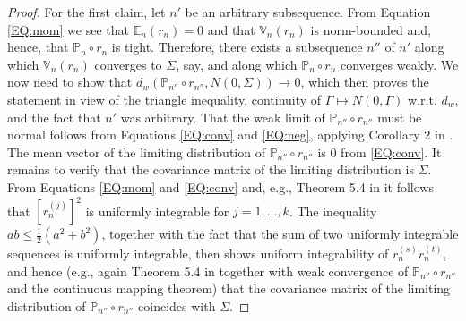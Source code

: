 \documentclass[preprint]{imsart}
\numberwithin{equation}{section}
\begin{document}
\begin{proof}
For the first claim, let $n'$ be an arbitrary subsequence. From Equation \eqref{EQ:mom} we see that $\mathbb{E}_n(r_n) = 0$ and that $\mathbb{V}_n(r_n)$ is norm-bounded and, hence, that $\mathbb{P}_n \circ r_n$ is tight. Therefore, there exists a subsequence $n''$ of $n'$ along which $\mathbb{V}_n(r_n)$ converges to $\Sigma$, say, and along which $\mathbb{P}_n \circ r_n$ converges weakly. We now need to show that $d_w(\mathbb{P}_{n''} \circ r_{n''}, N(0, \Sigma)) \rightarrow 0$, which then proves the statement in view of the triangle inequality, continuity of $\Gamma \mapsto N(0, \Gamma)$ w.r.t. $d_w$, and the fact that $n'$ was arbitrary. That the weak limit of $\mathbb{P}_{n''} \circ r_{n''}$ must be normal follows from Equations \eqref{EQ:conv} and \eqref{EQ:neg}, applying Corollary 2 in \cite{pollak1972}. The mean vector of the limiting distribution of $\mathbb{P}_{n''} \circ r_{n''}$ is $0$ from \eqref{EQ:conv}. It remains to verify that the covariance matrix of the limiting distribution is $\Sigma$. From Equations \eqref{EQ:mom} and \eqref{EQ:conv} and, e.g., Theorem 5.4 in \cite{bill2} it follows that $[r_{n}^{(j)}]^2$ is uniformly integrable for $j = 1, \hdots, k$. The inequality $ab \leq \frac{1}{2}(a^2 + b^2)$, together with the fact that the sum of two uniformly integrable sequences is uniformly integrable, then shows uniform integrability of $r_n^{(s)}r_n^{(t)}$, and hence (e.g., again Theorem 5.4 in \cite{bill2} together with weak convergence of $\mathbb{P}_{n''} \circ r_{n''}$ and the continuous mapping theorem) that the covariance matrix of the limiting distribution of $\mathbb{P}_{n''} \circ r_{n''}$ coincides with $\Sigma$.


\end{proof}
\end{document}
